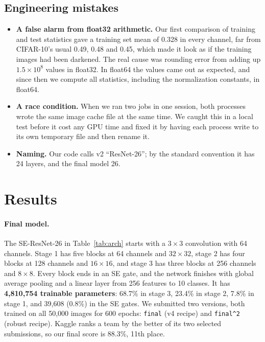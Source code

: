 \documentclass{article}
\begin{document}
\subsection{Engineering mistakes}
\begin{itemize}
  \item \textbf{A false alarm from float32 arithmetic.} Our first comparison of training and test statistics gave a
  training set mean of 0.328 in every channel, far from CIFAR-10's usual 0.49, 0.48 and 0.45, which made it look as if the
  training images had been darkened. The real cause was rounding error from adding up $1.5\times10^8$ values in float32.
  In float64 the values came out as expected, and since then we compute all statistics, including the normalization
  constants, in float64.
  \item \textbf{A race condition.} When we ran two jobs in one session, both processes wrote the same image cache file at
  the same time. We caught this in a local test before it cost any GPU time and fixed it by having each process write to
  its own temporary file and then rename it.
  \item \textbf{Naming.} Our code calls v2 ``ResNet-26''; by the standard convention it has 24 layers, and the final model 26.
\end{itemize}

\section{Results}

\paragraph{Final model.} The SE-ResNet-26 in Table~\ref{tab:arch} starts with a $3{\times}3$ convolution with 64 channels.
Stage 1 has five blocks at 64 channels and $32\times32$, stage 2 has four blocks at 128 channels and $16\times16$, and
stage 3 has three blocks at 256 channels and $8\times8$. Every block ends in an SE gate, and the network finishes with
global average pooling and a linear layer from 256 features to 10 classes. It has \textbf{4,810,754 trainable parameters}:
68.7\% in stage 3, 23.4\% in stage 2, 7.8\% in stage 1, and 39,608 (0.8\%) in the SE gates. We submitted two versions,
both trained on all 50,000 images for 600 epochs: \texttt{final} (v4 recipe) and \texttt{final\textasciicircum2} (robust
recipe). Kaggle ranks a team by the better of its two selected submissions, so our final score is 88.3\%, 11th place.
\end{document}
